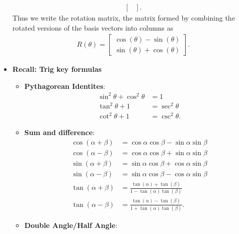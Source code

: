 \documentclass{report}
\begin{document}
\begin{itemize}
\begin{align*}
\begin{bmatrix}
                \end{bmatrix}
            .\end{align*}
            \bigbreak \noindent 
            Thus we write the rotation matrix, the matrix formed by combining the rotated versions of the basis vectors into columns as 
            \begin{align*}
                R(\theta ) = \begin{bmatrix}
                    \cos{\left(\theta \right)} - \sin{\left(\theta \right)} \\
                    \sin{\left(\theta \right)} + \cos{\left(\theta \right)}
                \end{bmatrix}
            .\end{align*}
        \item \textbf{Recall: Trig key formulas}
            \begin{itemize}
                \item \textbf{Pythagorean Identites}:
                    \begin{align*}
                        \sin^{2}{\theta} + \cos^{2}{\theta} &= 1 \\
                        \tan^{2}{\theta} +1 &= \sec^{2}{\theta} \\
                        \cot^{2}{\theta } + 1 &= \csc^{2}{\theta }
                    .\end{align*}
                \item \textbf{Sum and difference}:
                    \begin{align*}
                        \cos{(\alpha + \beta)} &= \cos{\alpha}\cos{\beta} - \sin{\alpha}\sin{\beta} \\
                        \cos{(\alpha - \beta)} &= \cos{\alpha}\cos{\beta} + \sin{\alpha}\sin{\beta} \\
                        \sin{(\alpha + \beta)} &= \sin{\alpha}\cos{\beta} + \cos{\alpha}\sin{\beta} \\
                        \sin{(\alpha - \beta)} &= \sin{\alpha}\cos{\beta} - \cos{\alpha}\sin{\beta} \\
                        \tan{(\alpha + \beta)} &= \frac{\tan(\alpha) + \tan(\beta)}{1-\tan(\alpha)\tan(\beta)}  \\
                        \tan{(\alpha - \beta)} &= \frac{\tan(\alpha) - \tan(\beta)}{1+\tan(\alpha)\tan(\beta)}  
                    .\end{align*}
                \item \textbf{Double Angle/Half Angle}:

\end{itemize}
\end{itemize}
\end{document}
